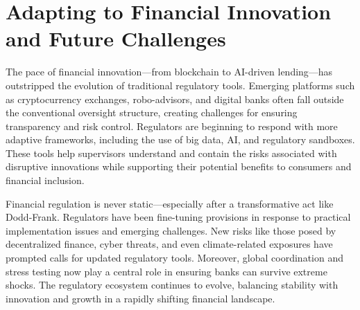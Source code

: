 \section{Adapting to Financial Innovation and Future Challenges}

The pace of financial innovation—from blockchain to AI-driven lending—has outstripped the evolution of traditional regulatory tools. Emerging platforms such as cryptocurrency exchanges, robo-advisors, and digital banks often fall outside the conventional oversight structure, creating challenges for ensuring transparency and risk control. Regulators are beginning to respond with more adaptive frameworks, including the use of big data, AI, and regulatory sandboxes. These tools help supervisors understand and contain the risks associated with disruptive innovations while supporting their potential benefits to consumers and financial inclusion.

Financial regulation is never static—especially after a transformative act like Dodd-Frank. Regulators have been fine-tuning provisions in response to practical implementation issues and emerging challenges. New risks like those posed by decentralized finance, cyber threats, and even climate-related exposures have prompted calls for updated regulatory tools. Moreover, global coordination and stress testing now play a central role in ensuring banks can survive extreme shocks. The regulatory ecosystem continues to evolve, balancing stability with innovation and growth in a rapidly shifting financial landscape.
